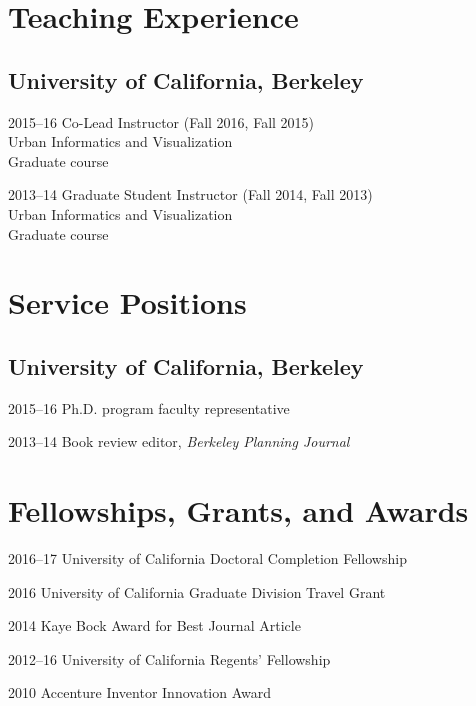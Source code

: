 \documentclass{academiccv}
\begin{document}
\section*{Teaching Experience}

\subsection*{University of California, Berkeley}

\begin{tablist}
\item[2015--16] \tab Co-Lead Instructor (Fall 2016, Fall 2015) \\
                     Urban Informatics and Visualization \\
                     Graduate course
\item[2013--14] \tab Graduate Student Instructor (Fall 2014, Fall 2013) \\
                     Urban Informatics and Visualization \\
                     Graduate course
\end{tablist}



\section*{Service Positions}

\subsection*{University of California, Berkeley}

\begin{tablist}
\item[2015--16] \tab Ph.D. program faculty representative
\item[2013--14] \tab Book review editor, \emph{Berkeley Planning Journal}
\end{tablist}


\section*{Fellowships, Grants, and Awards}

\begin{tablist}
\item[2016--17] \tab University of California Doctoral Completion Fellowship
\item[2016]     \tab University of California Graduate Division Travel Grant
\item[2014]     \tab Kaye Bock Award for Best Journal Article
\item[2012--16] \tab University of California Regents' Fellowship
\item[2010]     \tab Accenture Inventor Innovation Award
\end{tablist}
\end{document}
